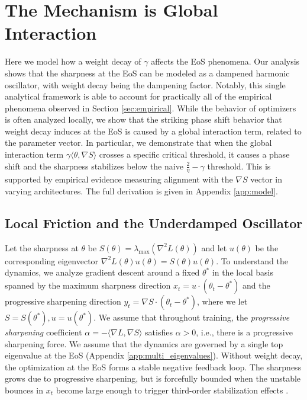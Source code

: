 \documentclass{article}
\begin{document}


\section{The Mechanism is Global Interaction}
\label{sec:model}

Here we model how a weight decay of $\gamma$ affects the EoS phenomena. Our analysis shows that the sharpness at the EoS can be modeled as a dampened harmonic oscillator, with weight decay being the dampening factor. Notably, this single analytical framework is able to account for practically all of the empirical phenomena observed in Section \ref{sec:empirical}. While the behavior of optimizers is often analyzed locally, we show that the striking phase shift behavior that weight decay induces at the EoS is caused by a global interaction term, related to the parameter vector. In particular, we demonstrate that when the global interaction term $\gamma\langle \theta, \nabla S\rangle$ crosses a specific critical threshold, it causes a phase shift and the sharpness stabilizes below the naive $\frac{2}{\eta}-\gamma$ threshold. This is supported by empirical evidence measuring alignment with the $\nabla S$ vector in varying architectures. The full derivation is given in Appendix \ref{app:model}.

\subsection{Local Friction and the Underdamped Oscillator}

Let the sharpness at $\theta$ be $S(\theta)=\lambda_{\max}\left(\nabla^2L(\theta)\right)$ and let $u(\theta)$ be the corresponding eigenvector $\nabla^2L(\theta)u(\theta)=S(\theta)u(\theta)$. To understand the dynamics, we analyze gradient descent around a fixed $\theta^*$ in the local basis spanned by the maximum sharpness direction $x_t = u \cdot (\theta_t - \theta^*)$ and the progressive sharpening direction $y_t = \nabla S \cdot (\theta_t - \theta^*)$, where we let $S=S(\theta^*),u=u(\theta^*)$. We assume that throughout training, the \emph{progressive sharpening} coefficient $\alpha=-\langle\nabla L,\nabla S\rangle$ satisfies $\alpha>0$, i.e., there is a progressive sharpening force. We assume that the dynamics are governed by a single top eigenvalue at the EoS (Appendix \ref{app:multi_eigenvalues}). Without weight decay, the optimization at the EoS forms a stable negative feedback loop. The sharpness grows due to progressive sharpening, but is forcefully bounded when the unstable bounces in $x_t$ become large enough to trigger third-order stabilization effects \citep{damian_selfstab}.
\end{document}
